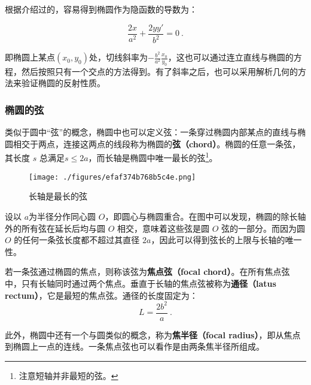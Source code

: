 根据介绍过的，容易得到椭圆作为隐函数的导数为：

\begin{equation}
\frac{2x}{a^2} + \frac{2yy'}{b^2} = 0~.
\end{equation}

即椭圆上某点$(x_0,y_0)$处，切线斜率为$\displaystyle-\frac{b^2}{a^2}\frac{x_0}{y_0}$，这也可以通过连立直线与椭圆的方程，然后按照只有一个交点的方法得到。有了斜率之后，也可以采用解析几何的方法来验证椭圆的反射性质。

\subsubsection{椭圆的弦}

类似于圆中“弦”的概念，椭圆中也可以定义弦：一条穿过椭圆内部某点的直线与椭圆相交于两点，连接这两点的线段称为椭圆的\textbf{弦（chord）}。椭圆的任意一条弦，其长度 $s$ 总满足$s\leq2a$，而长轴是椭圆中唯一最长的弦\footnote{注意短轴并非最短的弦。}。
\begin{figure}[ht]
\centering
\texttt{[image: ./figures/efaf374b768b5c4e.png]}
\caption{长轴是最长的弦} \label{fig_Elips3_4}
\end{figure}
设以 $a$为半径分作同心圆 $O$，即圆心与椭圆重合。在图中可以发现，椭圆的除长轴外的所有弦在延长后均与圆 $O$ 相交，意味着这些弦是圆 $O$ 弦的一部分。而因为圆 $O$ 的任何一条弦长度都不超过其直径 $2a$，因此可以得到弦长的上限与长轴的唯一性。

若一条弦通过椭圆的焦点，则称该弦为\textbf{焦点弦（focal chord）}。在所有焦点弦中，只有长轴同时通过两个焦点。垂直于长轴的焦点弦被称为\textbf{通径（latus rectum）}，它是最短的焦点弦。通径的长度固定为：
\begin{equation}
L = \frac{2b^2}{a}~.
\end{equation}

此外，椭圆中还有一个与圆类似的概念，称为\textbf{焦半径（focal radius）}，即从焦点到椭圆上一点的连线。一条焦点弦也可以看作是由两条焦半径所组成。

